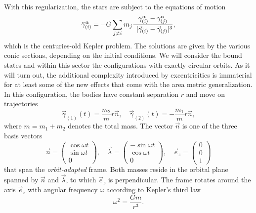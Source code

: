 With this regularization, the stars are subject to the equations of motion
\begin{equation}
  \ddot\gamma^\alpha_{(i)} = -G \sum_{j\neq i} m_j \frac{\gamma^\alpha_{(i)} - \gamma^\alpha_{(j)}}{\prescript{\hphantom{3}}{}\lvert\vec\gamma_{(i)} - \vec\gamma_{(j)}\rvert^3},
\end{equation}
which is the centuries-old Kepler problem. The solutions are given by the various conic sections, depending on the initial conditions. We will consider the bound states and within this sector the configurations with exactly circular orbits. As it will turn out, the additional complexity introduced by excentricities is immaterial for at least some of the new effects that come with the area metric generalization. In this configuration, the bodies have constant separation $r$ and move on trajectories
\begin{equation}\label{circular_orbit}
  \vec\gamma_{(1)}(t) = \frac{m_2}{m} r\vec n,\quad \vec\gamma_{(2)}(t) = -\frac{m_1}{m} r\vec n,
\end{equation}
where $m = m_1 + m_2$ denotes the total mass. The vector $\vec n$ is one of the three basis vectors
\begin{equation}
  \vec n = \begin{pmatrix} \operatorname{cos}\omega t \\ \operatorname{sin}\omega t \\ 0 \end{pmatrix},\quad \vec \lambda = \begin{pmatrix} -\operatorname{sin}\omega t \\ \operatorname{cos}\omega t \\ 0 \end{pmatrix},\quad \vec e_z = \begin{pmatrix}0 \\ 0 \\ 1\end{pmatrix}
\end{equation}
that span the \emph{orbit-adapted} frame\cite{poisson2014gravity}. Both masses reside in the orbital plane spanned by $\vec n$ and $\vec\lambda$, to which $\vec e_z$ is perpendicular. The frame rotates around the axis $\vec e_z$ with angular frequency $\omega$ according to Kepler's third law
\begin{equation}
  \omega^2 = \frac{Gm}{r^3}.
\end{equation}

